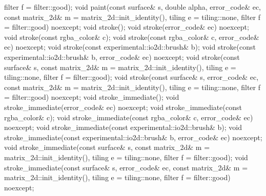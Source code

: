 \begin{codeblock}
{{{{{      filter f = filter::good);
    void paint(const surface& s, double alpha, error_code& ec,
      const matrix_2d& m = matrix_2d::init_identity(), tiling e = tiling::none, 
      filter f = filter::good)
      noexcept;
    void stroke();
    void stroke(error_code& ec) noexcept;
    void stroke(const rgba_color& c);
    void stroke(const rgba_color& c, error_code& ec) noexcept;
    void stroke(const experimental::io2d::brush& b);
    void stroke(const experimental::io2d::brush& b, error_code& ec) noexcept;
    void stroke(const surface& s,
      const matrix_2d& m = matrix_2d::init_identity(), tiling e = tiling::none,
      filter f = filter::good);
    void stroke(const surface& s, error_code& ec,
      const matrix_2d& m = matrix_2d::init_identity(), tiling e = tiling::none, 
      filter f = filter::good) noexcept;
    void stroke_immediate();
    void stroke_immediate(error_code& ec) noexcept;
    void stroke_immediate(const rgba_color& c);
    void stroke_immediate(const rgba_color& c, error_code& ec) noexcept;
    void stroke_immediate(const experimental::io2d::brush& b);
    void stroke_immediate(const experimental::io2d::brush& b, error_code& ec)
      noexcept;
    void stroke_immediate(const surface& s,
      const matrix_2d& m = matrix_2d::init_identity(), tiling e = tiling::none, 
      filter f = filter::good);
    void stroke_immediate(const surface& s, error_code& ec,
      const matrix_2d& m = matrix_2d::init_identity(), tiling e = tiling::none, 
      filter f = filter::good) noexcept;
    
}}}}}
\end{codeblock}
